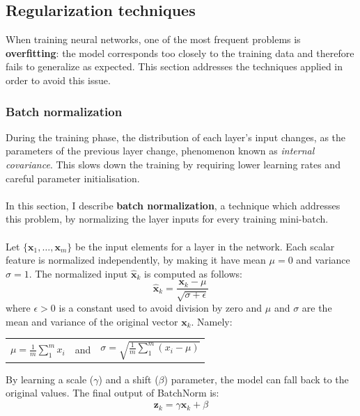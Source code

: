 	\subsection{Regularization techniques} \label{Section: impl/ml/reg}
	When training neural networks, one of the most frequent problems is \textbf{overfitting}: the model corresponds too closely to the training data and therefore fails to generalize as expected. This section addresses the techniques applied in order to avoid this issue.
	\subsubsection{Batch normalization} \label{Section: impl/ml/reg/batch}
	During the training phase, the distribution of each layer's input changes, as the parameters of the previous layer change, phenomenon known as \textit{internal covariance}. This slows down the training by requiring lower learning rates and careful parameter initialisation. 
	\\ \\
	In this section, I describe \textbf{batch normalization}\cite{DBLP:journals/corr/IoffeS15}, a technique which addresses this problem, by normalizing the layer inputs for every training mini-batch. 
	\\ \\
	Let $\{ \mathbf{x}_1, \dots, \mathbf{x}_m  \}$ be the input elements for a layer in the network. Each scalar feature is normalized independently, by making it have mean $\mu = 0$ and variance $\sigma = 1$.  The normalized input $\mathbf{\hat{x}}_k$ is computed as follows:
	\begin{equation}
		\mathbf{\hat{x}}_k = \frac{\mathbf{x}_k - \mu}{\sqrt{\sigma + \epsilon}}
	\end{equation}
	where $\epsilon > 0$ is a constant used to avoid division by zero and $\mu$ and $\sigma$ are the mean and variance of the original vector $\mathbf{x}_k$. Namely:
	\begin{longtable}{ccc}

				$\mu = \frac{1}{m} \sum_{1}^{m} x_i$

			&   and   &

				$\sigma = \sqrt{\frac{1}{m}\sum_{1}^{m}(x_i - \mu)}$

	\end{longtable}
	By learning a scale ($\gamma$) and a shift ($\beta$) parameter, the model can fall back to the original values. The final output of BatchNorm is: 
	\begin{equation}
		\mathbf{z}_k = \gamma \mathbf{\hat{x}}_k + \beta
	\end{equation} 
